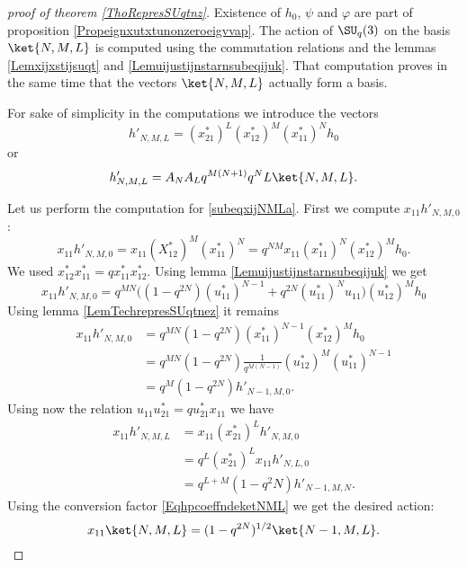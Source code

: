 \begin{proof}[proof of theorem \ref{ThoRepresSUqtnz}]
    Existence of \( h_0\), \( \psi\) and \( \varphi\) are part of proposition \ref{Propeignxutxtunonzeroeigvvap}. The action of \( \SU_q(3)\) on the basis \( \ket{N,M,L}\) is computed using the commutation relations and the lemmas \ref{Lemxijxstijsuqt} and \ref{Lemuijustijnstarnsubeqijuk}. That computation proves in the same time that the vectors \( \ket{N,M,L}\) actually form a basis.

    For sake of simplicity in the computations we introduce the vectors
    \begin{equation}
        h'_{N,M,L}=(x_{21}^*)^L(x_{12}^*)^M(x_{11}^*)^Nh_0
    \end{equation}
    or
    \begin{equation}        \label{EqhpcoeffndeketNML}
        h'_{N,M,L}=A_NA_Lq^{M(N+1)}q^NL\ket{N,M,L}.
    \end{equation}

    Let us perform the computation for \eqref{subeqxijNMLa}. First we compute \( x_{11}h'_{N,M,0}\):
    \begin{equation}
        x_{11}h'_{N,M,0}=x_{11}(X_{12}^*)^M(x_{11}^*)^N=q^{NM}x_{11}(x_{11}^*)^N(x_{12}^*)^Mh_0.
    \end{equation}
    We used \( x_{12}^*x_{11}^*=qx_{11}^*x_{12}^*\). Using lemma \ref{Lemuijustijnstarnsubeqijuk} we get
    \begin{equation}
        x_{11}h'_{N,M,0}=q^{MN}\Big( (1-q^{2N})(u_{11}^*)^{N-1}+q^{2N}(u_{11}^*)^{N}u_{11} \Big)(u_{12}^*)^Mh_0
    \end{equation}
    Using lemma \ref{LemTechrepresSUqtnez} it remains
    \begin{subequations}
        \begin{align}
            x_{11}h'_{N,M,0}&=q^{MN}(1-q^{2N})(x_{11}^*)^{N-1}(x_{12}^*)^Mh_0\\
            &=q^{MN}(1-q^{2N})\frac{1}{ q^{M(N-1)} }(u_{12}^*)^M(u_{11}^*)^{N-1}\\
            &=q^M(1-q^{2N})h'_{N-1,M,0}.
        \end{align}
    \end{subequations}
    Using now the relation \( u_{11}u_{21}^*=qu_{21}^*x_{11}\) we have
    \begin{subequations}
        \begin{align}
            x_{11}h'_{N,M,L}&=x_{11}(x_{21}^*)^Lh'_{N,M,0}\\
            &=q^L(x_{21}^*)^Lx_{11}h'_{N,L,0}\\
            &=q^{L+M}(1-q^2N)h'_{N-1,M,N}.
        \end{align}
    \end{subequations}
    Using the conversion factor \eqref{EqhpcoeffndeketNML} we get the desired action:
    \begin{equation}
        x_{11}\ket{N,M,L}=(1-q^{2N})^{1/2}\ket{N-1,M,L}.
    \end{equation}
    
    
\end{proof}


